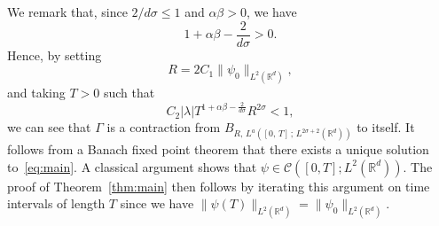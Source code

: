 \documentclass[AHL,Unicode,longabstracts,published]{cedram}
\newcommand{\bbR}{\mathbb{R}}
\newcommand{\clC}{\mathcal{C}}
\begin{document}
We remark that, since $2/d\sigma\leq 1$ and $\alpha\beta>0$, we have
\[
1+\alpha\beta-\frac{2}{d\sigma}> 0.
\]
Hence, by setting
\[
R = 2 C_1\|\psi_0\|_{L^2\left(\bbR^d\right)},
\]
and taking $T>0$ such that
\[
C_2|\lambda| T^{1+\alpha\beta-\frac{2}{d\sigma}} R^{2\sigma}< 1,
\]
we can see that $\Gamma$ is a contraction from $B_{R,\,L^{a}([0,\,T]\,;\,L^{2\sigma+2}(\bbR^d))}$ to itself. It follows from a Banach fixed point theorem that there exists a unique solution to~\eqref{eq:main}. A classical argument shows that $\psi\in\clC([0,T];L^2(\bbR^d))$. The proof of Theorem~\ref{thm:main} then follows by iterating this argument on time intervals of length $T$ since we have $\|\psi(T)\|_{L^2(\bbR^d)} = \|\psi_0\|_{L^2(\bbR^d)}$.



\end{document}
